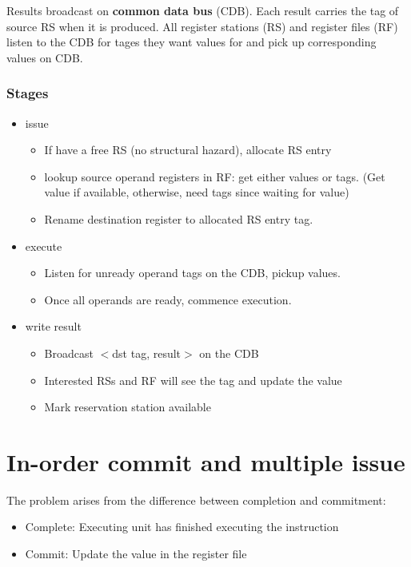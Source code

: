 \documentclass[letterpaper,12pt]{article}
\begin{document}
Results broadcast on \textbf{common data bus} (CDB). Each result carries the tag of source RS when it is produced. All register stations (RS) and register files (RF) listen to the CDB for tages they want values for and pick up corresponding values on CDB.

\subsubsection{Stages}

\begin{itemize}
    \item issue
          \begin{itemize}
              \item If have a free RS (no structural hazard), allocate RS entry
              \item lookup source operand registers in RF: get either values or tags. (Get value if available, otherwise, need tags since waiting for value)
              \item Rename destination register to allocated RS entry tag.
          \end{itemize}
    \item execute
          \begin{itemize}
              \item Listen for unready operand tags on the CDB, pickup values.
              \item Once all operands are ready, commence execution.
          \end{itemize}
    \item write result
          \begin{itemize}
              \item Broadcast $<$dst tag, result$>$ on the CDB
              \item Interested RSs and RF will see the tag and update the value
              \item Mark reservation station available
          \end{itemize}
\end{itemize}


\section{In-order commit and multiple issue}

The problem arises from the difference between completion and commitment:
\begin{itemize}
    \item Complete: Executing unit has finished executing the instruction
    \item Commit: Update the value in the register file
\end{itemize}
\end{document}
